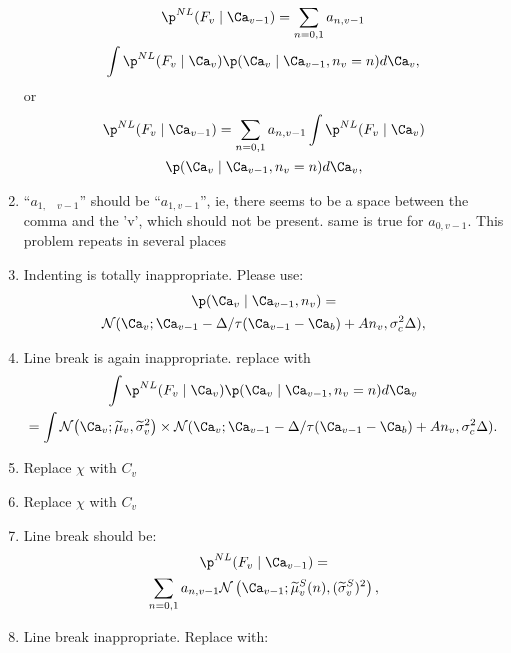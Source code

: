 \begin{enumerate}
\begin{multline*}
\p^{NL}(F_v \mid \Ca_{v-1}) = \sum_{n=0,1} a_{n,v-1} \\
\int \p^{NL}(F_v \mid \Ca_v) \p(\Ca_v \mid \Ca_{v-1}, n_v=n) d\Ca_v,
\end{multline*}
or 
\begin{multline*} 
\p^{NL}(F_v \mid \Ca_{v-1}) = \sum_{n=0,1} a_{n,v-1} \int \p^{NL}(F_v \mid \Ca_v) \\
 \p(\Ca_v \mid \Ca_{v-1}, n_v=n) d\Ca_v,
\end{multline*}
\item ``$a_{1, \quad v-1}$'' should be ``$a_{1,v-1}$'', ie, there seems to be a space between the comma and the 'v', which should not be present. same is true for $a_{0,v-1}$.  This problem repeats in several places \label{comma}
\item Indenting is totally inappropriate.  Please use:
\begin{multline*}
\p(\Ca_v \mid \Ca_{v-1}, n_v) =\\
\mathcal{N}(\Ca_v; \Ca_{v-1} -\Delta/\tau (\Ca_{v-1} - \Ca_b) + A n_v, \sigma_c^2 \Delta),
\end{multline*}
\item Line break is again inappropriate.  replace with
\begin{multline*}
\int \p^{NL}(F_v \mid \Ca_v) \p(\Ca_v \mid \Ca_{v-1}, n_v=n) d\Ca_v
\\= \int \mathcal{N}\big(\Ca_v; \widetilde{\mu}_v, \widetilde{\sigma}_v^2\big)  \times \mathcal{N}(\Ca_v; \Ca_{v-1} -\Delta/\tau (\Ca_{v-1} - \Ca_b) + A n_v, \sigma_c^2 \Delta).
\end{multline*}
\item Replace $\chi$ with $C_v$
\item Replace $\chi$ with $C_v$
\item Line break should be:
\begin{multline*}
\p^{NL}(F_v \mid \Ca_{v-1}) = \\ \sum_{n=0,1} a_{n,v-1}  \mathcal{N} \left(\Ca_{v-1}; \widetilde{\mu}^{S}_v(n), (\widetilde{\sigma}_v^S)^2 \right),%
\end{multline*}
\item  Line break inappropriate.  Replace with:


\end{enumerate}
